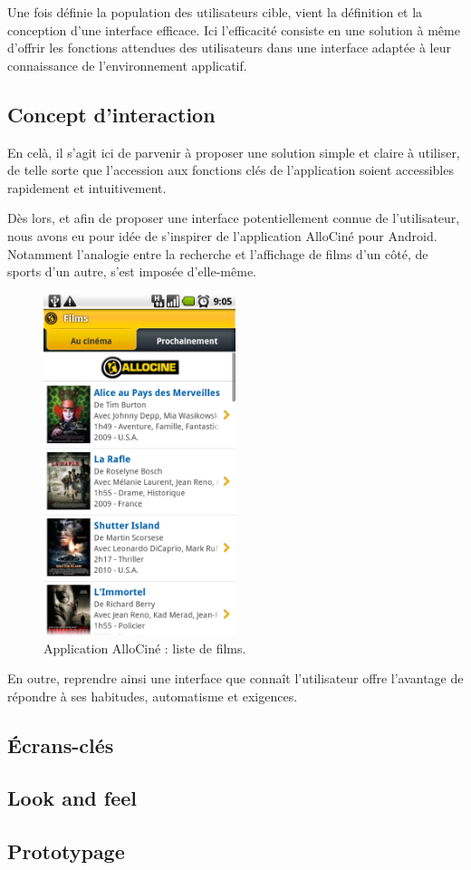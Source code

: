 \documentclass{article}
\begin{document}
	Une fois définie la population des utilisateurs cible, vient la définition et la conception d'une interface efficace. Ici l'efficacité consiste en une solution à même d'offrir les fonctions attendues des utilisateurs dans une interface adaptée à leur connaissance de l'environnement applicatif.

	\subsection{Concept d'interaction}
	
	En celà, il s'agit ici de parvenir à proposer une solution simple et claire à utiliser, de telle sorte que l'accession aux fonctions clés de l'application soient accessibles rapidement et intuitivement.
	
	Dès lors, et afin de proposer une interface potentiellement connue de l'utilisateur, nous avons eu pour idée de s'inspirer de l'application AlloCiné pour Android. Notamment l'analogie entre la recherche et l'affichage de films d'un côté, de sports d'un autre, s'est imposée d'elle-même.
	
	\begin{figure}[ht]
		\centering
		\includegraphics[width=0.5\textwidth]{allocine.png}
		\caption{Application AlloCiné : liste de films.}
		\label{fig:allocine}
	\end{figure}
	
	En outre, reprendre ainsi une interface que connaît l'utilisateur offre l'avantage de répondre à ses habitudes, automatisme	et exigences.
	
	\subsection{Écrans-clés}
	
	
	
	\subsection{Look and feel}
	
	
	
	\subsection{Prototypage}
\end{document}
